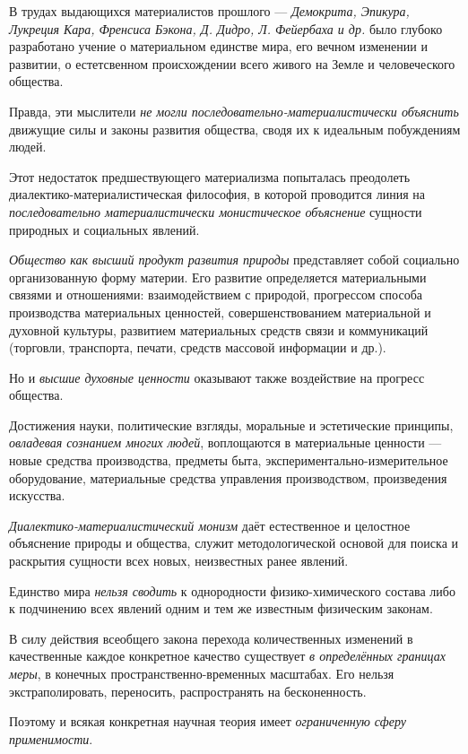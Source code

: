 \documentclass[a4paper,14pt,russian]{extreport}
\begin{document}
В трудах выдающихся материалистов прошлого --- \emph{Демокрита, Эпикура, Лукреция Кара, Френсиса Бэкона, Д. Дидро, Л. Фейербаха и др.} было глубоко разработано учение о материальном единстве мира, его вечном изменении и развитии, о естетсвенном происхождении всего живого на Земле и человеческого общества.

Правда, эти мыслители \emph{не могли последовательно-материалистически объяснить} движущие силы и законы развития общества, сводя их к идеальным побуждениям людей.

Этот недостаток предшествующего материализма попыталась преодолеть диалектико-материалистическая философия, в которой проводится линия на \emph{последовательно материалистически монистическое объяснение} сущности природных и социальных явлений.

\emph{Общество как высший продукт развития природы} представляет собой социально организованную форму материи. Его развитие определяется материальными связями и отношениями: взаимодействием с природой, прогрессом способа производства материальных ценностей, совершенствованием материальной и духовной культуры, развитием материальных средств связи и коммуникаций (торговли, транспорта, печати, средств массовой информации и др.).

Но и \emph{высшие духовные ценности} оказывают также воздействие на прогресс общества.

Достижения науки, политические взгляды, моральные и эстетические принципы, \emph{овладевая сознанием многих людей}, воплощаются в материальные ценности --- новые средства производства, предметы быта, экспериментально-измерительное оборудование, материальные средства управления производством, произведения искусства.

\emph{Диалектико-материалистический монизм} даёт естественное и целостное объяснение природы и общества, служит методологической основой для поиска и раскрытия сущности всех новых, неизвестных ранее явлений.

Единство мира \emph{нельзя сводить} к однородности физико-химического состава либо к подчинению всех явлений одним и тем же известным физическим законам.

В силу действия всеобщего закона перехода количественных изменений в качественные каждое конкретное качество существует \emph{в определённых границах меры}, в конечных пространственно-временных масштабах. Его нельзя экстраполировать, переносить, распространять на бесконенность.

Поэтому и всякая конкретная научная теория имеет \emph{ограниченную сферу применимости}.
\end{document}
